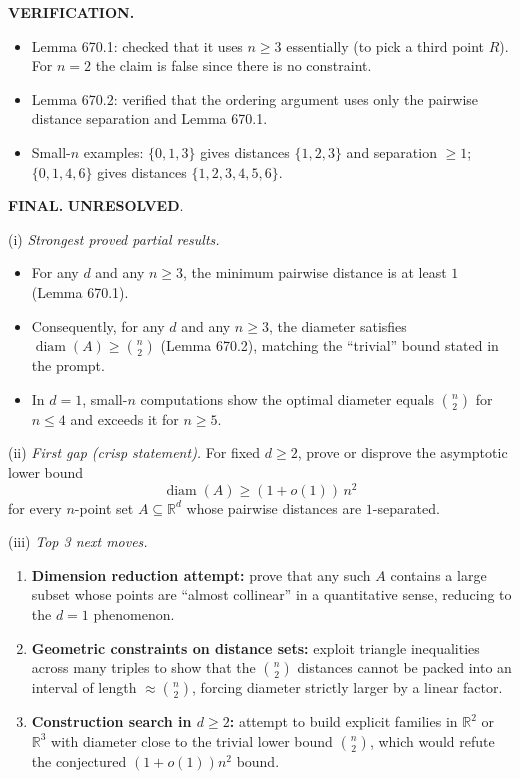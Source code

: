 \bigskip
\noindent\textbf{VERIFICATION.}
\begin{itemize}
\item Lemma 670.1: checked that it uses $n\ge 3$ essentially (to pick a third point $R$). For $n=2$ the claim is false since there is no constraint.
\item Lemma 670.2: verified that the ordering argument uses only the pairwise distance separation and Lemma 670.1.
\item Small-$n$ examples: $\{0,1,3\}$ gives distances $\{1,2,3\}$ and separation $\ge 1$; $\{0,1,4,6\}$ gives distances $\{1,2,3,4,5,6\}$.
\end{itemize}

\bigskip
\noindent\textbf{FINAL.} \textbf{UNRESOLVED}.

\smallskip
\noindent(i) \emph{Strongest proved partial results.}
\begin{itemize}
\item For any $d$ and any $n\ge 3$, the minimum pairwise distance is at least $1$ (Lemma 670.1).
\item Consequently, for any $d$ and any $n\ge 3$, the diameter satisfies $\operatorname{diam}(A)\ge \binom n2$ (Lemma 670.2), matching the ``trivial'' bound stated in the prompt.
\item In $d=1$, small-$n$ computations show the optimal diameter equals $\binom n2$ for $n\le 4$ and exceeds it for $n\ge 5$.
\end{itemize}

\noindent(ii) \emph{First gap (crisp statement).}
For fixed $d\ge 2$, prove or disprove the asymptotic lower bound
\[
\operatorname{diam}(A) \ge (1+o(1))\,n^2
\]
for every $n$-point set $A\subseteq\mathbb{R}^d$ whose pairwise distances are $1$-separated.

\noindent(iii) \emph{Top 3 next moves.}
\begin{enumerate}
\item \textbf{Dimension reduction attempt:} prove that any such $A$ contains a large subset whose points are ``almost collinear'' in a quantitative sense, reducing to the $d=1$ phenomenon.
\item \textbf{Geometric constraints on distance sets:} exploit triangle inequalities across many triples to show that the $\binom n2$ distances cannot be packed into an interval of length $\approx \binom n2$, forcing diameter strictly larger by a linear factor.
\item \textbf{Construction search in $d\ge 2$:} attempt to build explicit families in $\mathbb{R}^2$ or $\mathbb{R}^3$ with diameter close to the trivial lower bound $\binom n2$, which would refute the conjectured $(1+o(1))n^2$ bound.
\end{enumerate}

